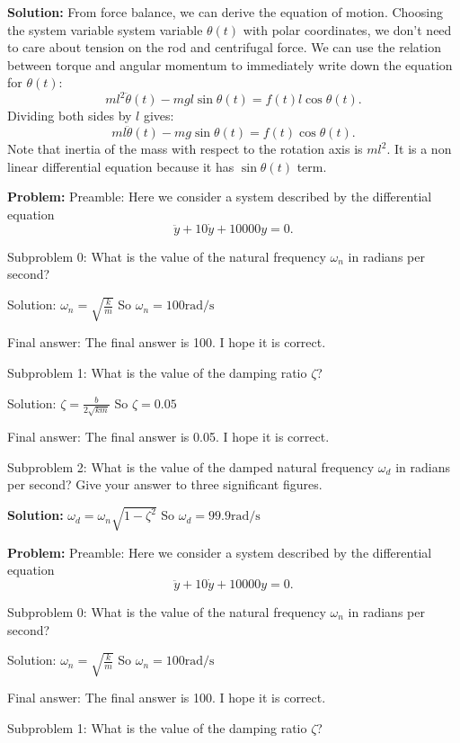 \documentclass[10pt]{article}
\begin{document}
\textbf{Solution:}
From force balance, we can derive the equation of motion. Choosing the system variable system variable $\theta(t)$ with polar coordinates, we don't need to care about tension on the rod and centrifugal force.
We can use the relation between torque and angular momentum to immediately write down the equation for $\theta(t)$:
\[
m l^{2} \ddot{\theta}(t)-m g l \sin \theta(t)=f(t) l \cos \theta(t) .
\]
Dividing both sides by $l$ gives:
\[
\boxed{m l \ddot{\theta}(t)-m g \sin \theta(t)=f(t) \cos \theta(t)} .
\]
Note that inertia of the mass with respect to the rotation axis is $m l^{2}$. It is a non linear differential equation because it has $\sin \theta(t)$ term.


\textbf{Problem:}
Preamble: Here we consider a system described by the differential equation
\[
\ddot{y}+10 \dot{y}+10000 y=0 .
\]

Subproblem 0: What is the value of the natural frequency \(\omega_{n}\) in radians per second?


Solution: $\omega_{n}=\sqrt{\frac{k}{m}}$
So
$\omega_{n} =\boxed{100} \mathrm{rad} / \mathrm{s}$

Final answer: The final answer is 100. I hope it is correct.

Subproblem 1: What is the value of the damping ratio \(\zeta\)? 


Solution: $\zeta=\frac{b}{2 \sqrt{k m}}$
So
$\zeta =\boxed{0.05}$

Final answer: The final answer is 0.05. I hope it is correct.

Subproblem 2: What is the value of the damped natural frequency \(\omega_{d}\) in radians per second? Give your answer to three significant figures.


\textbf{Solution:}
$\omega_{d}=\omega_{n} \sqrt{1-\zeta^{2}}$
So
$\omega_{d}=\boxed{99.9} \mathrm{rad} / \mathrm{s}$


\textbf{Problem:}
Preamble: Here we consider a system described by the differential equation
\[
\ddot{y}+10 \dot{y}+10000 y=0 .
\]

Subproblem 0: What is the value of the natural frequency \(\omega_{n}\) in radians per second?


Solution: $\omega_{n}=\sqrt{\frac{k}{m}}$
So
$\omega_{n} =\boxed{100} \mathrm{rad} / \mathrm{s}$

Final answer: The final answer is 100. I hope it is correct.

Subproblem 1: What is the value of the damping ratio \(\zeta\)? 
\end{document}
